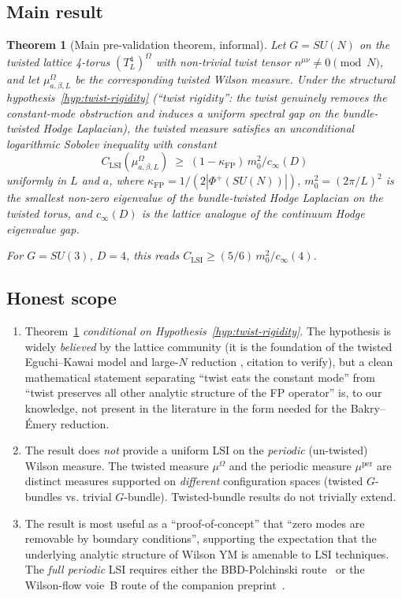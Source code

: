 \documentclass[11pt,a4paper]{amsart}
\newtheorem{theorem}{Theorem}[section]
\theoremstyle{definition}
\newcommand{\kFP}{\kappa_{\mathrm{FP}}}
\newcommand{\cinf}{c_{\infty}}
\begin{document}
\subsection{Main result}
\begin{theorem}[Main pre-validation theorem, informal]\label{thm:main-informal}
Let $G = SU(N)$ on the twisted lattice 4-torus
$(T^4_L)^\Omega$ with non-trivial twist tensor $n^{\mu\nu} \neq 0 \pmod N$,
and let $\mu^\Omega_{a,\beta,L}$ be the corresponding twisted Wilson
measure. Under the structural hypothesis~\ref{hyp:twist-rigidity}
(``twist rigidity'': the twist genuinely removes the constant-mode
obstruction and induces a uniform spectral gap on the bundle-twisted
Hodge Laplacian), the twisted measure satisfies an unconditional
logarithmic Sobolev inequality with constant
$$
C_\mathrm{LSI}(\mu^\Omega_{a,\beta,L})
\;\geq\; (1-\kFP)\,m_0^2 / \cinf(D)
$$
uniformly in $L$ and $a$, where $\kFP = 1/(2|\Phi^+(SU(N))|)$, $m_0^2 =
(2\pi/L)^2$ is the smallest non-zero eigenvalue of the bundle-twisted
Hodge Laplacian on the twisted torus, and $\cinf(D)$ is the lattice
analogue of the continuum Hodge eigenvalue gap.

For $G = SU(3)$, $D=4$, this reads $C_\mathrm{LSI} \geq (5/6)\,m_0^2 /
\cinf(4)$.
\end{theorem}

\subsection{Honest scope}
\label{sec:scope}
\begin{enumerate}[label=(\alph*),leftmargin=2em]
\item Theorem~\ref{thm:main-informal} \emph{conditional on
Hypothesis~\ref{hyp:twist-rigidity}}. The hypothesis is widely
\emph{believed} by the lattice community (it is the foundation of the
twisted Eguchi--Kawai model and large-$N$ reduction
\cite{EguchiKawai1982,GonzalezArroyoOkawa1983}, citation to verify),
but a clean mathematical statement separating ``twist eats the
constant mode'' from ``twist preserves all other analytic structure
of the FP operator'' is, to our knowledge, not present in the
literature in the form needed for the Bakry--\'Emery reduction.
\item The result does \emph{not} provide a uniform LSI on the
\emph{periodic} (un-twisted) Wilson measure. The twisted measure
$\mu^\Omega$ and the periodic measure $\mu^\mathrm{per}$ are distinct
measures supported on \emph{different} configuration spaces (twisted
$G$-bundles vs. trivial $G$-bundle). Twisted-bundle results do not
trivially extend.
\item The result is most useful as a ``proof-of-concept'' that
``zero modes are removable by boundary conditions'', supporting the
expectation that the underlying analytic structure of Wilson YM is
amenable to LSI techniques. The \emph{full periodic} LSI requires
either the BBD-Polchinski route~\cite{BauerschmidtDagallier2024} or
the Wilson-flow voie~B route of the companion
preprint~\cite{RemondiereWilsonFlowVoieB_2026}.
\end{enumerate}
\end{document}
